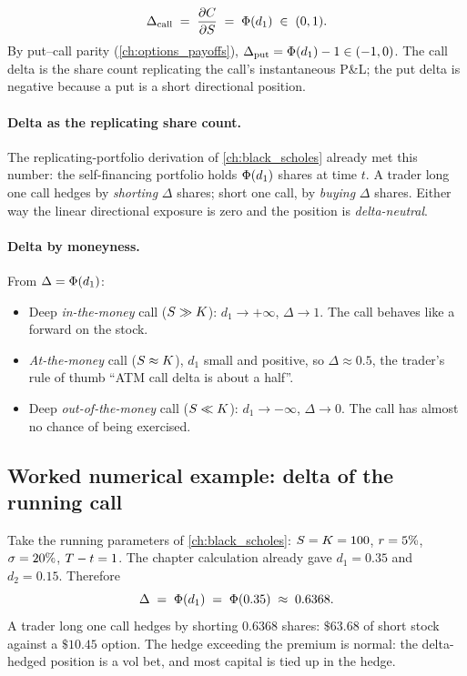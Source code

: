 \begin{keyfactbox}
\begin{equation*}
  \Delta_{\text{call}} \;=\; \frac{\partial C}{\partial S}
   \;=\; \Phi(d_1) \;\in\; (0, 1).
\end{equation*}
By put--call parity (\cref{ch:options_payoffs}),
$\Delta_{\text{put}} = \Phi(d_1) - 1 \in (-1, 0)$. The call delta
is the share count replicating the call's instantaneous P\&L; the
put delta is negative because a put is a short directional
position.
\end{keyfactbox}

\paragraph{Delta as the replicating share count.}
The replicating-portfolio derivation of \cref{ch:black_scholes}
already met this number: the self-financing portfolio holds
$\Phi(d_1)$ shares at time $t$. A trader long one call hedges by
\emph{shorting} $\Delta$ shares; short one call, by \emph{buying}
$\Delta$ shares. Either way the linear directional exposure is
zero and the position is \emph{delta-neutral}.

\paragraph{Delta by moneyness.} From $\Delta = \Phi(d_1)$:
\begin{itemize}
  \item Deep \emph{in-the-money} call ($S \gg K$): $d_1
  \to +\infty$, $\Delta \to 1$. The call behaves like a forward on
  the stock.
  \item \emph{At-the-money} call ($S \approx K$), $d_1$
  small and positive, so $\Delta \approx 0.5$, the trader's rule
  of thumb ``ATM call delta is about a half''.
  \item Deep \emph{out-of-the-money} call ($S \ll K$):
  $d_1 \to -\infty$, $\Delta \to 0$. The call has almost no chance
  of being exercised.
\end{itemize}

\subsection{Worked numerical example: delta of the running call}
\label{subsec:ch16_delta_numex}

Take the running parameters of \cref{ch:black_scholes}:
$S = K = 100$, $r = 5\%$, $\sigma = 20\%$,
$T - t = 1$. The chapter calculation already gave
$d_1 = 0.35$ and $d_2 = 0.15$. Therefore
\begin{equation}
  \Delta \;=\; \Phi(d_1) \;=\; \Phi(0.35) \;\approx\; 0.6368.
  \label{eq:delta_numex}
\end{equation}
A trader long one call hedges by shorting $0.6368$ shares: $\$63.68$
of short stock against a $\$10.45$ option. The hedge exceeding the
premium is normal: the delta-hedged position is a vol bet, and
most capital is tied up in the hedge.

